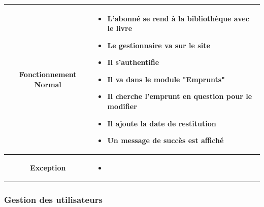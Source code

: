 \par 
\begin{tabular}{|c|p{7cm}|}
        \hline
        \textbf{Fonctionnement Normal} & \begin{itemize}
                \item L'abonné se rend à la bibliothèque avec le livre
                \item Le gestionnaire va sur le site
                \item Il s'authentifie
                \item Il va dans le module "Emprunts"
                \item Il cherche l'emprunt en question pour le modifier
                \item Il ajoute la date de restitution
                \item Un message de succès est affiché
        \end{itemize} \\
        \hline
        \textbf{Exception} & \begin{itemize}
                \item 
        \end{itemize} \\
        \hline
\end{tabular}

\subsubsection{Gestion des utilisateurs} 
